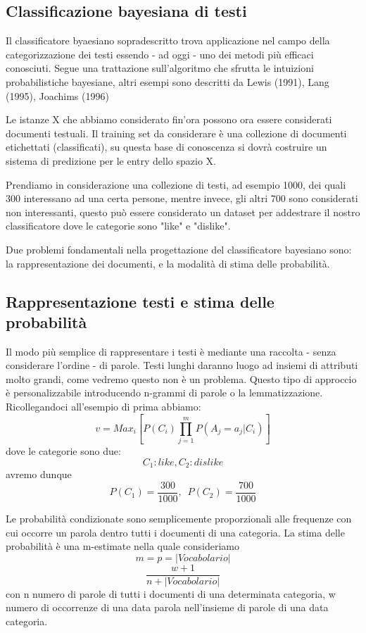 \documentclass{article}
\theoremstyle{plain}
\theoremstyle{definition}
\begin{document}
\subsection{Classificazione bayesiana di testi }
Il classificatore byaesiano sopradescritto trova applicazione nel campo della categorizzazione dei testi essendo - ad oggi - uno dei metodi più efficaci conosciuti.
Segue una trattazione sull'algoritmo che sfrutta le intuizioni probabilistiche bayesiane, altri esempi sono descritti da Lewis (1991), Lang (1995), Joachims (1996)\footnotemark
{}

Le istanze X che abbiamo considerato fin'ora possono ora essere considerati documenti testuali. Il training set da considerare è una collezione di documenti etichettati (classificati), su questa base di conoscenza si dovrà costruire un sistema di predizione per le entry dello spazio X.

Prendiamo in considerazione una collezione di testi, ad esempio 1000, dei quali 300 interessano ad una certa persone, mentre invece, gli altri 700 sono considerati non interessanti, questo può essere considerato un dataset per addestrare il nostro classificatore dove le categorie sono "like" e "dislike".

Due problemi fondamentali nella progettazione del classificatore bayesiano sono: la rappresentazione dei documenti, e la modalità di stima delle probabilità.

\subsection{Rappresentazione testi e stima delle probabilità}
Il modo più semplice di rappresentare i testi è mediante una raccolta - senza considerare l'ordine - di parole. Testi lunghi daranno luogo ad insiemi di attributi molto grandi, come vedremo questo non è un problema. Questo tipo di approccio è personalizzabile introducendo n-grammi di parole o la lemmatizzazione.
Ricollegandoci all'esempio di prima abbiamo: 
$$v=Max_i [P(C_i)\prod_{j=1}^m P(A_j=a_j|C_i)]$$
dove le categorie sono due: $$C_1:like, C_2:dislike$$
avremo dunque $$P(C_1)=\frac{300}{1000},\,\,\, P(C_2)=\frac{700}{1000}$$

Le probabilità condizionate sono semplicemente proporzionali alle frequenze con cui occorre un parola dentro tutti i documenti di una categoria.
La stima delle probabilità è una m-estimate nella quale consideriamo $$m=p=|Vocabolario|$$
$$\frac{w+1}{n+|Vocabolario|}$$
con n numero di parole di tutti i documenti di una determinata categoria, w numero di occorrenze di una data parola nell'insieme di parole di una data categoria.
\end{document}
